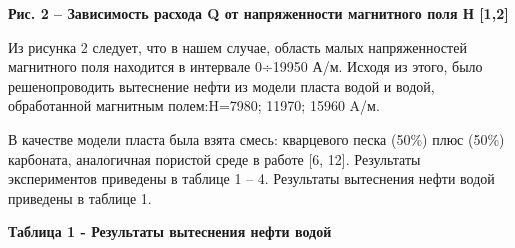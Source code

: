 {\bfseries Рис. 2 -- Зависимость расхода Q от напряженности магнитного поля
Н {[}1,2{]}}

Из рисунка 2 следует, что в нашем случае, область малых напряженностей
магнитного поля находится в интервале 0÷19950 А/м. Исходя из этого, было
решенопроводить вытеснение нефти из модели пласта водой и водой,
обработанной магнитным полем:H=7980; 11970; 15960 A/м.

В качестве модели пласта была взята смесь: кварцевого песка (50\%) плюс
(50\%) карбоната, аналогичная пористой среде в работе {[}6, 12{]}.
Результаты экспериментов приведены в таблице 1 -- 4. Результаты
вытеснения нефти водой приведены в таблице 1.

{\bfseries Таблица 1 - Результаты вытеснения нефти водой}

